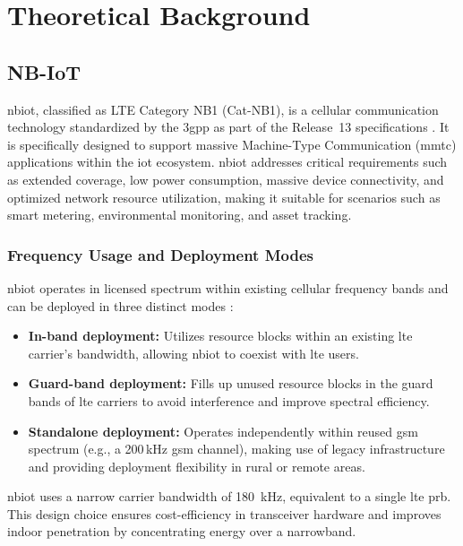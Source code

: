 \documentclass[12pt, english, openany]{book}
\begin{document}
\chapter{Theoretical Background} \label{chap:theoretical_background}
\section{NB-IoT} \label{sec:nbiot}


\gls{nbiot}, classified as LTE Category NB1 (Cat-NB1), is a cellular communication technology standardized by the \gls{3gpp} as part of the Release~13 specifications \parencite{NBIOT_SYSTEM}. It is specifically designed to support massive Machine-Type Communication (\gls{mmtc}) applications within the \gls{iot} ecosystem. \gls{nbiot} addresses critical requirements such as extended coverage, low power consumption, massive device connectivity, and optimized network resource utilization, making it suitable for scenarios such as smart metering, environmental monitoring, and asset tracking.

\subsection{Frequency Usage and Deployment Modes}

\gls{nbiot} operates in licensed spectrum within existing cellular frequency bands and can be deployed in three distinct modes \parencite{NBIOT_SYSTEM}:

\begin{itemize}
    \item \textbf{In-band deployment:} Utilizes resource blocks within an existing \gls{lte} carrier's bandwidth, allowing \gls{nbiot} to coexist with \gls{lte} users.
    \item \textbf{Guard-band deployment:} Fills up unused resource blocks in the guard bands of \gls{lte} carriers to avoid interference and improve spectral efficiency.
    \item \textbf{Standalone deployment:} Operates independently within reused \gls{gsm} spectrum (e.g., a 200\,kHz \gls{gsm} channel), making use of legacy infrastructure and providing deployment flexibility in rural or remote areas.
\end{itemize}

\gls{nbiot} uses a narrow carrier bandwidth of \SI{180}{kHz}, equivalent to a single \gls{lte} \gls{prb}. This design choice ensures cost-efficiency in transceiver hardware and improves indoor penetration by concentrating energy over a narrowband.
\end{document}
